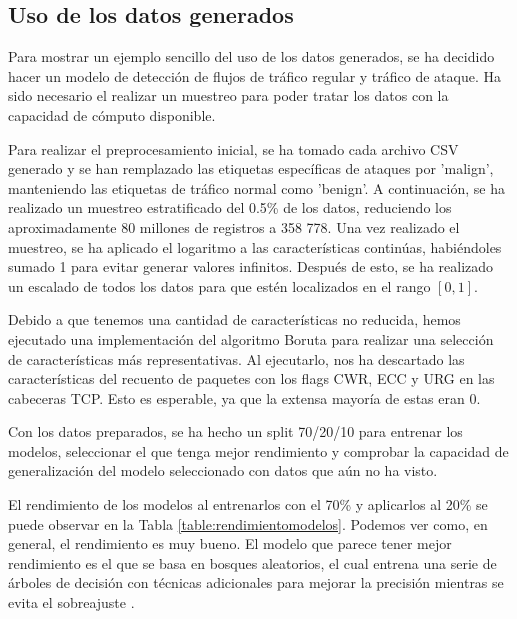 \documentclass[10pt,a4paper,twoside]{article}
\begin{document}
\begin{multicols}{2}
    \section{Uso de los datos generados} \label{casoml}

    Para mostrar un ejemplo sencillo del uso de los datos generados, se ha decidido hacer un modelo de detección de flujos de tráfico regular y tráfico de ataque. Ha sido necesario el realizar un muestreo para poder tratar los datos con la capacidad de cómputo disponible. 

    Para realizar el preprocesamiento inicial, se ha tomado cada archivo CSV generado y se han remplazado las etiquetas específicas de ataques por 'malign', manteniendo las etiquetas de tráfico normal como 'benign'. A continuación, se ha realizado un muestreo estratificado del 0.5\% de los datos, reduciendo los aproximadamente 80 millones de registros a 358 778. Una vez realizado el muestreo, se ha aplicado el logaritmo a las características continúas, habiéndoles sumado 1 para evitar generar valores infinitos. Después de esto, se ha realizado un escalado de todos los datos para que estén localizados en el rango $[0, 1]$. 
    
    Debido a que tenemos una cantidad de características no reducida, hemos ejecutado una implementación del algoritmo Boruta \cite{borutapy} para realizar una selección de características más representativas. Al ejecutarlo, nos ha descartado las características del recuento de paquetes con los flags CWR, ECC y URG en las cabeceras TCP. Esto es esperable, ya que la extensa mayoría de estas eran 0.

    Con los datos preparados, se ha hecho un split 70/20/10 para entrenar los modelos, seleccionar el que tenga mejor rendimiento y comprobar la capacidad de generalización del modelo seleccionado con datos que aún no ha visto. 

    El rendimiento de los modelos al entrenarlos con el 70\% y aplicarlos al 20\% se puede observar en la Tabla \ref{table:rendimientomodelos}. Podemos ver como, en general, el rendimiento es muy bueno. El modelo que parece tener mejor rendimiento es el que se basa en bosques aleatorios, el cual entrena una serie de árboles de decisión con técnicas adicionales para mejorar la precisión mientras se evita el sobreajuste \cite{sklearnrandomforest}.


\end{multicols}
\end{document}

